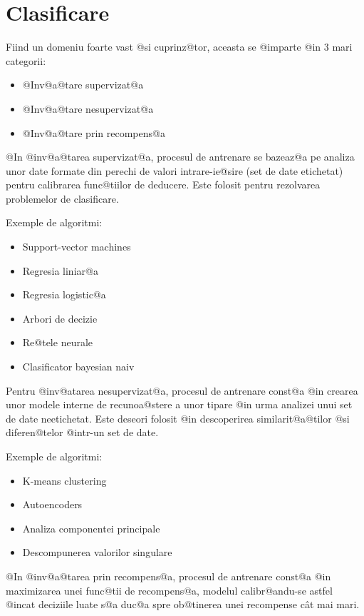 
\newpage

\section{Clasificare}

Fiind un domeniu foarte vast @si cuprinz@tor, aceasta se @imparte @in 3 mari categorii:
\hspace{0.2cm}\begin{itemize}
	\item @Inv@a@tare supervizat@a
	\item @Inv@a@tare nesupervizat@a
	\item @Inv@a@tare prin recompens@a
\end{itemize}

\vspace{0.3cm}
@In @inv@a@tarea supervizat@a, procesul de antrenare se bazeaz@a pe analiza unor date formate din perechi de valori intrare-ie@sire (set de date etichetat) pentru calibrarea func@tiilor de deducere. Este folosit pentru rezolvarea problemelor de clasificare.

Exemple de algoritmi:
\begin{itemize}
	\item Support-vector machines
	\item Regresia liniar@a
	\item Regresia logistic@a
	\item Arbori de decizie
	\item Re@tele neurale
	\item Clasificator bayesian naiv
\end{itemize}

Pentru @inv@atarea nesupervizat@a, procesul de antrenare const@a @in crearea unor modele interne de recunoa@stere a unor tipare @in urma analizei unui set de date neetichetat. Este deseori folosit @in descoperirea similarit@a@tilor @si diferen@telor @intr-un set de date.

Exemple de algoritmi:
\begin{itemize}
	\item K-means clustering
	\item Autoencoders
	\item Analiza componentei principale
	\item Descompunerea valorilor singulare
\end{itemize}

@In @inv@a@tarea prin recompens@a, procesul de antrenare const@a @in maximizarea unei func@tii de recompens@a, modelul calibr@andu-se astfel @incat deciziile luate s@a duc@a spre ob@tinerea unei recompense c\^ at mai mari.

